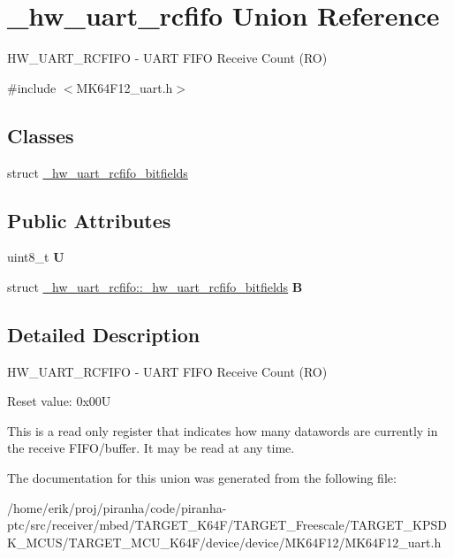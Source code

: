 \hypertarget{union__hw__uart__rcfifo}{}\section{\+\_\+hw\+\_\+uart\+\_\+rcfifo Union Reference}
\label{union__hw__uart__rcfifo}


H\+W\+\_\+\+U\+A\+R\+T\+\_\+\+R\+C\+F\+I\+FO -\/ U\+A\+RT F\+I\+FO Receive Count (RO)  




{\ttfamily \#include $<$M\+K64\+F12\+\_\+uart.\+h$>$}

\subsection*{Classes}
\begin{DoxyCompactItemize}
\item 
struct \hyperlink{struct__hw__uart__rcfifo_1_1__hw__uart__rcfifo__bitfields}{\+\_\+hw\+\_\+uart\+\_\+rcfifo\+\_\+bitfields}
\end{DoxyCompactItemize}
\subsection*{Public Attributes}
\begin{DoxyCompactItemize}
\item 
uint8\+\_\+t {\bfseries U}\hypertarget{union__hw__uart__rcfifo_a91098f066696f97fa4c49682da38e722}{}\label{union__hw__uart__rcfifo_a91098f066696f97fa4c49682da38e722}

\item 
struct \hyperlink{struct__hw__uart__rcfifo_1_1__hw__uart__rcfifo__bitfields}{\+\_\+hw\+\_\+uart\+\_\+rcfifo\+::\+\_\+hw\+\_\+uart\+\_\+rcfifo\+\_\+bitfields} {\bfseries B}\hypertarget{union__hw__uart__rcfifo_a65347bbc2aa1e8c3b2a4a7c070a31851}{}\label{union__hw__uart__rcfifo_a65347bbc2aa1e8c3b2a4a7c070a31851}

\end{DoxyCompactItemize}


\subsection{Detailed Description}
H\+W\+\_\+\+U\+A\+R\+T\+\_\+\+R\+C\+F\+I\+FO -\/ U\+A\+RT F\+I\+FO Receive Count (RO) 

Reset value\+: 0x00U

This is a read only register that indicates how many datawords are currently in the receive F\+I\+F\+O/buffer. It may be read at any time. 

The documentation for this union was generated from the following file\+:\begin{DoxyCompactItemize}
\item 
/home/erik/proj/piranha/code/piranha-\/ptc/src/receiver/mbed/\+T\+A\+R\+G\+E\+T\+\_\+\+K64\+F/\+T\+A\+R\+G\+E\+T\+\_\+\+Freescale/\+T\+A\+R\+G\+E\+T\+\_\+\+K\+P\+S\+D\+K\+\_\+\+M\+C\+U\+S/\+T\+A\+R\+G\+E\+T\+\_\+\+M\+C\+U\+\_\+\+K64\+F/device/device/\+M\+K64\+F12/M\+K64\+F12\+\_\+uart.\+h\end{DoxyCompactItemize}
